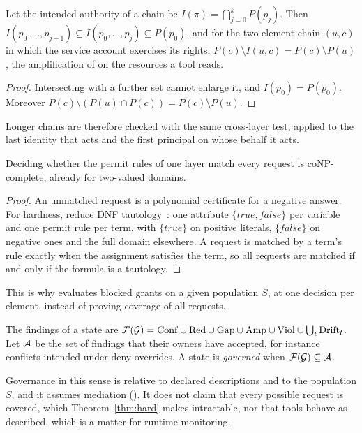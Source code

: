 \begin{theorem}[Attenuation]\label{thm:chain}
Let the intended authority of a chain be $I(\pi) = \bigcap_{j=0}^{k} P(p_j)$. Then $I(p_0, \dots, p_{j+1}) \subseteq I(p_0, \dots, p_j) \subseteq P(p_0)$, and for the two-element chain $(u, c)$ in which the service account exercises its rights, $P(c) \setminus I(u, c) = P(c) \setminus P(u)$, the amplification of  on the resources a tool reads.
\end{theorem}
\begin{proof}
Intersecting with a further set cannot enlarge it, and $I(p_0) = P(p_0)$. Moreover $P(c) \setminus (P(u) \cap P(c)) = P(c) \setminus P(u)$.
\end{proof}
Longer chains are therefore checked with the same cross-layer test, applied to the last identity that acts and the first principal on whose behalf it acts.

\begin{theorem}\label{thm:hard}
Deciding whether the permit rules of one layer match every request is coNP-complete, already for two-valued domains.
\end{theorem}
\begin{proof}
An unmatched request is a polynomial certificate for a negative answer. For hardness, reduce DNF tautology~\cite{garey1979intractability}: one attribute $\{\mathit{true}, \mathit{false}\}$ per variable and one permit rule per term, with $\{\mathit{true}\}$ on positive literals, $\{\mathit{false}\}$ on negative ones and the full domain elsewhere. A request is matched by a term's rule exactly when the assignment satisfies the term, so all requests are matched if and only if the formula is a tautology.
\end{proof}
This is why \name{} evaluates blocked grants on a given population $S$, at one decision per element, instead of proving coverage of all requests.

\begin{definition}\label{def:governed}
The findings of a state are $\mathcal{F}(\mathcal{G}) = \mathrm{Conf} \cup \mathrm{Red} \cup \mathrm{Gap} \cup \mathrm{Amp} \cup \mathrm{Viol} \cup \bigcup_t \mathrm{Drift}_t$. Let $\mathcal{A}$ be the set of findings that their owners have accepted, for instance conflicts intended under deny-overrides. A state is \emph{governed} when $\mathcal{F}(\mathcal{G}) \subseteq \mathcal{A}$.
\end{definition}
Governance in this sense is relative to declared descriptions and to the population $S$, and it assumes mediation (). It does not claim that every possible request is covered, which Theorem~\ref{thm:hard} makes intractable, nor that tools behave as described, which is a matter for runtime monitoring.

